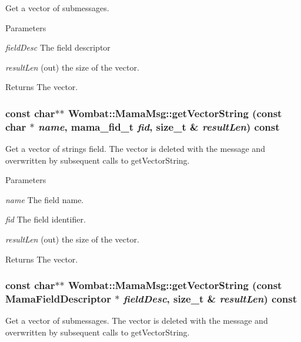 Get a vector of submessages. 
\begin{DoxyParams}{Parameters}
\item[{\em fieldDesc}]The field descriptor \item[{\em resultLen}](out) the size of the vector. \end{DoxyParams}
\begin{DoxyReturn}{Returns}
The vector. 
\end{DoxyReturn}
\hypertarget{classWombat_1_1MamaMsg_a8e0c42d1bd8b6d5eec91c16b0fb206a4}{
\subsubsection[{getVectorString}]{\setlength{\rightskip}{0pt plus 5cm}const char$\ast$$\ast$ Wombat::MamaMsg::getVectorString (const char $\ast$ {\em name}, \/  mama\_\-fid\_\-t {\em fid}, \/  size\_\-t \& {\em resultLen}) const}}
\label{classWombat_1_1MamaMsg_a8e0c42d1bd8b6d5eec91c16b0fb206a4}


Get a vector of strings field. The vector is deleted with the message and overwritten by subsequent calls to getVectorString.


\begin{DoxyParams}{Parameters}
\item[{\em name}]The field name. \item[{\em fid}]The field identifier. \item[{\em resultLen}](out) the size of the vector. \end{DoxyParams}
\begin{DoxyReturn}{Returns}
The vector. 
\end{DoxyReturn}
\hypertarget{classWombat_1_1MamaMsg_ab56b9c561f6d24cf814a11d7910fc5d5}{
\subsubsection[{getVectorString}]{\setlength{\rightskip}{0pt plus 5cm}const char$\ast$$\ast$ Wombat::MamaMsg::getVectorString (const {\bf MamaFieldDescriptor} $\ast$ {\em fieldDesc}, \/  size\_\-t \& {\em resultLen}) const}}
\label{classWombat_1_1MamaMsg_ab56b9c561f6d24cf814a11d7910fc5d5}


Get a vector of submessages. The vector is deleted with the message and overwritten by subsequent calls to getVectorString.


